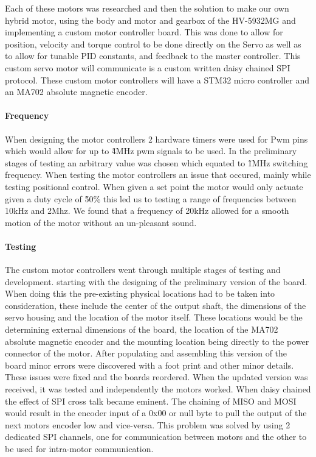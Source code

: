         Each of these motors was researched and then the solution to make our own hybrid motor, using the body and motor and gearbox of the HV-5932MG and implementing a custom motor controller board. This was done to allow for position, velocity and torque control to be done directly on the Servo as well as to allow for tunable PID constants, and feedback to the master controller. This custom servo motor will communicate is a custom written daisy chained SPI protocol. These custom motor controllers will have a STM32 micro controller and an MA702 absolute magnetic encoder\cite{MA702}.
        \paragraph{Frequency}
        When designing the motor controllers 2 hardware timers were used for Pwm pins which would allow for up to \~4MHz pwm signals to be used. In the preliminary stages of testing an arbitrary value was chosen which equated to \~1MHz switching frequency. When testing the motor controllers an issue that occured, mainly while testing positional control. When given a set point the motor would only actuate given a duty cycle of  \~50\% this led us to testing a range of frequencies between 10kHz and 2Mhz. We found that a frequency of 20kHz allowed for a smooth motion of the motor without an un-pleasant sound.  
        \paragraph{Testing} 
        The custom motor controllers went through multiple stages of testing and development. starting with the designing of the preliminary version of the board. When doing this the pre-existing physical locations had to be taken into consideration, these include the center of the output shaft, the dimensions of the servo housing and the location of the motor itself. These locations would be the determining external dimensions of the board, the location of the MA702 absolute magnetic encoder and the mounting location being directly to the power connector of the motor. After populating and assembling this version of the board minor errors were discovered with a foot print and other minor details. These issues were fixed and the boards reordered. When the updated version was received, it was tested and independently the motors worked. When daisy chained the effect of SPI cross talk became eminent. The chaining of MISO and MOSI would result in the encoder input of a 0x00 or null byte to pull the output of the next motors encoder low and vice-versa. This problem was solved by using 2 dedicated SPI channels, one for communication between motors and the other to be used for intra-motor communication. 
        
